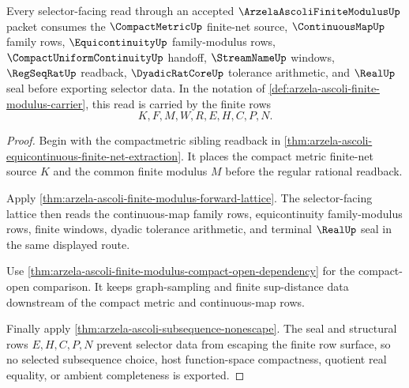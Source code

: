\begin{theorem}
\label{thm:arzela-ascoli-finite-modulus-compactmetric-link}
Every selector-facing read through an accepted
$\ArzelaAscoliFiniteModulusUp$ packet consumes the $\CompactMetricUp$
finite-net source, $\ContinuousMapUp$ family rows, $\EquicontinuityUp$
family-modulus rows, $\CompactUniformContinuityUp$ handoff,
$\StreamNameUp$ windows, $\RegSeqRatUp$ readback, $\DyadicRatCoreUp$
tolerance arithmetic, and $\RealUp$ seal before exporting selector data. In
the notation of \autoref{def:arzela-ascoli-finite-modulus-carrier}, this read
is carried by the finite rows
$$
K,F,M,W,R,E,H,C,P,N .
$$
\end{theorem}
\begin{proof}
Begin with the compactmetric sibling readback in
\autoref{thm:arzela-ascoli-equicontinuous-finite-net-extraction}. It places
the compact metric finite-net source $K$ and the common finite modulus $M$
before the regular rational readback.

Apply \autoref{thm:arzela-ascoli-finite-modulus-forward-lattice}. The
selector-facing lattice then reads the continuous-map family rows,
equicontinuity family-modulus rows, finite windows, dyadic tolerance
arithmetic, and terminal $\RealUp$ seal in the same displayed route.

Use \autoref{thm:arzela-ascoli-finite-modulus-compact-open-dependency} for
the compact-open comparison. It keeps graph-sampling and finite sup-distance
data downstream of the compact metric and continuous-map rows.

Finally apply \autoref{thm:arzela-ascoli-subsequence-nonescape}. The seal and
structural rows $E,H,C,P,N$ prevent selector data from escaping the finite
row surface, so no selected subsequence choice, host function-space
compactness, quotient real equality, or ambient completeness is exported.
\end{proof}

